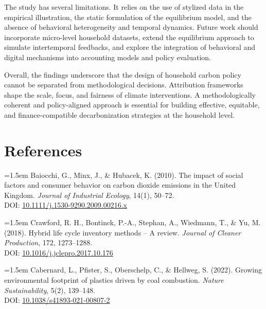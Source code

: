 \documentclass[12pt,a4paper]{article}%
\begin{document}
The study has several limitations. It relies on the use of stylized data in the empirical illustration, the static formulation of the equilibrium model, and the absence of behavioral heterogeneity and temporal dynamics. Future work should incorporate micro-level household datasets, extend the equilibrium approach to simulate intertemporal feedbacks, and explore the integration of behavioral and digital mechanisms into accounting models and policy evaluation.

Overall, the findings underscore that the design of household carbon policy cannot be separated from methodological decisions. Attribution frameworks shape the scale, focus, and fairness of climate interventions. A methodologically coherent and policy-aligned approach is essential for building effective, equitable, and finance-compatible decarbonization strategies at the household level.

\newpage

\section*{References}



\vspace{0.5em}
{\small
\noindent
\parbox{\linewidth}{
\hangindent=1.5em
Baiocchi, G., Minx, J., \& Hubacek, K. (2010). The impact of social factors and consumer behavior on carbon dioxide emissions in the United Kingdom. \textit{Journal of Industrial Ecology}, 14(1), 50–72. \\
DOI: \href{https://doi.org/10.1111/j.1530-9290.2009.00216.x}{10.1111/j.1530-9290.2009.00216.x}
}
}

{\small
\noindent
\parbox{\linewidth}{
\hangindent=1.5em
Crawford, R. H., Bontinck, P.-A., Stephan, A., Wiedmann, T., \& Yu, M. (2018). Hybrid life cycle inventory methods – A review. \textit{Journal of Cleaner Production}, 172, 1273–1288. \\
DOI: \href{https://doi.org/10.1016/j.jclepro.2017.10.176}{10.1016/j.jclepro.2017.10.176}
}
}

\vspace{0.5em}
{\small
\noindent
\parbox{\linewidth}{
\hangindent=1.5em
Cabernard, L., Pfister, S., Oberschelp, C., \& Hellweg, S. (2022). Growing environmental footprint of plastics driven by coal combustion. \textit{Nature Sustainability}, 5(2), 139–148. \\
DOI: \href{https://doi.org/10.1038/s41893-021-00807-2}{10.1038/s41893-021-00807-2}
}
}
\end{document}
